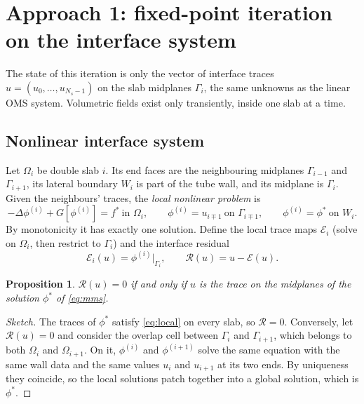 \documentclass[11pt,a4paper]{article}
\newtheorem{proposition}{Proposition}
\theoremstyle{remark}\newtheorem{remark}{Remark}
\begin{document}
\section{Approach 1: fixed-point iteration on the interface system}\label{sec:iface}
The state of this iteration is only the vector of interface traces
$u=(u_0,\dots,u_{N_s-1})$ on the slab midplanes $\Gamma_i$, the same unknowns
as the linear OMS system. Volumetric fields exist only transiently, inside
one slab at a time.

\subsection{Nonlinear interface system}
Let $\Omega_i$ be double slab $i$. Its end faces are the neighbouring midplanes
$\Gamma_{i-1}$ and $\Gamma_{i+1}$, its lateral boundary $W_i$ is part of the
tube wall, and its midplane is $\Gamma_i$. Given the neighbours' traces, the
\emph{local nonlinear problem} is
\begin{equation}\label{eq:local}
  -\Delta\phi^{(i)}+G[\phi^{(i)}]=f^*\ \text{in }\Omega_i,\qquad
  \phi^{(i)}=u_{i\mp1}\ \text{on }\Gamma_{i\mp1},\qquad \phi^{(i)}=\phi^*\ \text{on }W_i .
\end{equation}
By monotonicity it has exactly one solution. Define the local trace maps $\mathcal E_i$ (solve on $\Omega_i$, then restrict
to $\Gamma_i$) and the interface residual
\begin{equation}
  \mathcal E_i(u)=\phi^{(i)}\big|_{\Gamma_i},\qquad
  \mathcal R(u)=u-\mathcal E(u).
\end{equation}

\begin{proposition}\label{prop:equiv}
$\mathcal R(u)=0$ if and only if $u$ is the trace on the midplanes of the
solution $\phi^*$ of \eqref{eq:mms}.
\end{proposition}
\begin{proof}[Sketch]
The traces of $\phi^*$ satisfy \eqref{eq:local} on every slab, so $\mathcal R=0$.
Conversely, let $\mathcal R(u)=0$ and consider the overlap cell between
$\Gamma_i$ and $\Gamma_{i+1}$, which belongs to both $\Omega_i$ and
$\Omega_{i+1}$. On it, $\phi^{(i)}$ and $\phi^{(i+1)}$ solve the same equation
with the same wall data and the same values $u_i$ and $u_{i+1}$ at its two
ends. By uniqueness they coincide, so the local solutions patch together into
a global solution, which is $\phi^*$.
\end{proof}
\end{document}

